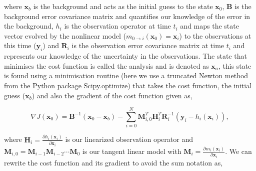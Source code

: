 \documentclass[11pt]{article}
\begin{document}
where $\textbf{x}_b$ is the background and acts as the initial guess to the state $\textbf{x}_0$, $\textbf{B}$ is the background error covariance matrix and quantifies our knowledge of the error in the background, $h_i$ is the observation operator at time $t_i$ and maps the state vector evolved by the nonlinear model ($m_{0\rightarrow i}(\mathbf{x}_{0})=\textbf{x}_i$) to the observations at this time ($\textbf{y}_i$) and $\textbf{R}_i$ is the observation error covariance matrix at time $t_i$ and represents our knowledge of the uncertainty in the observations. The state that minimises the cost function is called the analysis and is denoted as $\textbf{x}_a$, this state is found using a minimisation routine (here we use a truncated Newton method \citep{Nocedal1999} from the Python package Scipy.optimize) that takes the cost function, the initial guess ($\textbf{x}_b$) and also the gradient of the cost function given as,

\begin{equation}
\nabla J(\textbf{x}_0) = \textbf{B}^{-1}(\textbf{x}_0-\textbf{x}_b)-\sum_{i=0}^{N}\textbf{M}_{i,0}^{T}\textbf{H}_i^{T}\textbf{R}_{i}^{-1}(\textbf{y}_i-h_i(\textbf{x}_i)),
\end{equation}

where $\textbf{H}_i = \frac{\partial h_i(\textbf{x}_i)}{\partial\textbf{x}_i}$ is our linearized observation operator and $\mathbf{M}_{i,0}=\mathbf{M}_{i-1}\mathbf{M}_{i-2}\cdots\mathbf{M}_0$ is our tangent linear model with $\mathbf{M}_i=\frac{\partial m_{i}(\textbf{x}_{i})}{\partial \textbf{x}_{i}}$. We can rewrite the cost function and its gradient to avoid the sum notation as,
\end{document}

